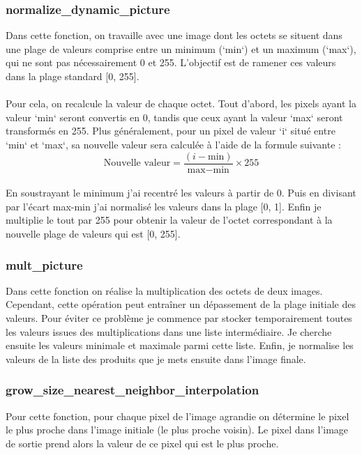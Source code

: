 \documentclass[12pt,a4paper]{article}
\begin{document}
\subsubsection{normalize\_dynamic\_picture}
Dans cette fonction, on travaille avec une image dont les octets se situent dans une plage de valeurs comprise entre un minimum (`min`) et un maximum (`max`), qui ne sont pas nécessairement 0 et 255. L'objectif est de ramener ces valeurs dans la plage standard [0, 255].\\
\\
Pour cela, on recalcule la valeur de chaque octet. Tout d'abord, les pixels ayant la valeur `min` seront convertis en 0, tandis que ceux ayant la valeur `max` seront transformés en 255. Plus généralement, pour un pixel de valeur `i` situé entre `min` et `max`, sa nouvelle valeur sera calculée à l'aide de la formule suivante :\\
\[
\text{Nouvelle valeur} = \frac{(i - \text{min})}{\text{max} - \text{min}}\times 255
\]
\\
En soustrayant le minimum j'ai recentré les valeurs à partir de 0. Puis en divisant par l'écart max-min j'ai normalisé les valeurs dans la plage [0, 1]. Enfin je multiplie le tout par 255 pour obtenir la valeur de l'octet correspondant à la nouvelle plage de valeurs qui est [0, 255].
\subsubsection{mult\_picture}
Dans cette fonction on réalise la multiplication des octets de deux images. Cependant, cette opération peut entraîner un dépassement de la plage initiale des valeurs. Pour éviter ce problème je commence par stocker temporairement toutes les valeurs issues des multiplications dans une liste intermédiaire. Je cherche ensuite les valeurs minimale et maximale parmi cette liste. Enfin, je normalise les valeurs de la liste des produits que je mets ensuite dans l'image finale.
\subsubsection{grow\_size\_nearest\_neighbor\_interpolation}
Pour cette fonction, pour chaque pixel de l'image agrandie on détermine le pixel le plus proche dans l'image initiale (le plus proche voisin). Le pixel dans l'image de sortie prend alors la valeur de ce pixel qui est le plus proche.
\end{document}
